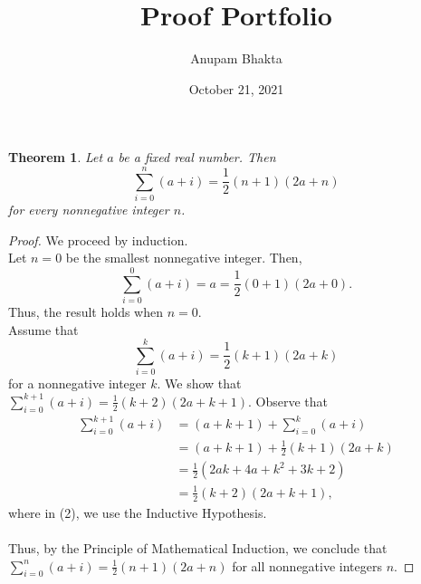 \documentclass[11pt]{article}
\date{October 21, 2021}
\title{Proof Portfolio}
\author{Anupam Bhakta}
\newtheorem{theorem}{Theorem}
\begin{document}
	
\maketitle

\begin{theorem}
	Let $a$ be a fixed real number. Then 
	\[\sum_{i=0}^n(a+i)=\frac{1}{2}(n+1)(2a+n)\]
	for every nonnegative integer $n$.
\end{theorem}

\begin{proof}
	We proceed by induction. \\
	Let $n = 0$ be the smallest nonnegative integer. Then,
	$$\sum_{i=0}^{0}(a+i) = a = \frac{1}{2}(0+1)(2a+0).$$
	Thus, the result holds when $n = 0$. \\
	Assume that
	$$\sum_{i=0}^k(a+i)=\frac{1}{2}(k+1)(2a+k)$$
	for a nonnegative integer $k$. We show that $\sum_{i=0}^{k+1}(a+i)=\frac{1}{2}(k+2)(2a+k+1)$. Observe that
	\begin{align}
		\sum_{i=0}^{k+1}(a+i)&= (a+k+1) + \sum_{i=0}^{k}(a+i) \\
		&=(a+k+1) + \frac{1}{2}(k+1)(2a+k) \\
		&= \frac{1}{2}(2ak + 4a + k^2 +3k +2) \\
		&=\frac{1}{2}(k+2)(2a+k+1),
	\end{align}
	where in (2), we use the Inductive Hypothesis.\\\\
	Thus, by the Principle of Mathematical Induction, we conclude that $\sum_{i=0}^n(a+i)=\frac{1}{2}(n+1)(2a+n)$ for all nonnegative integers $n$.
\end{proof}
\end{document}
